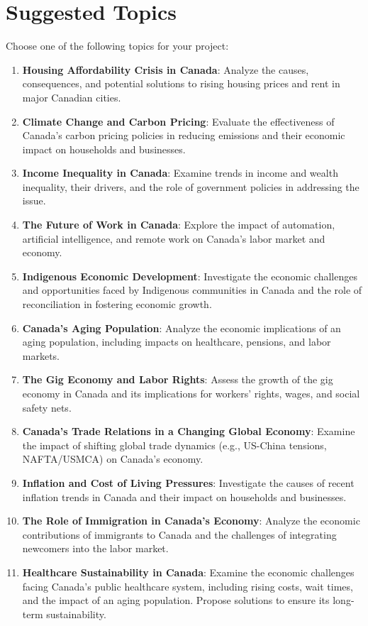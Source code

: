 \documentclass[12pt]{article}
\begin{document}
\section*{Suggested Topics}
Choose one of the following topics for your project:
\begin{enumerate}[label=\arabic*.]
    \item \textbf{Housing Affordability Crisis in Canada}: Analyze the causes, consequences, and potential solutions to rising housing prices and rent in major Canadian cities.
    \item \textbf{Climate Change and Carbon Pricing}: Evaluate the effectiveness of Canada’s carbon pricing policies in reducing emissions and their economic impact on households and businesses.
    \item \textbf{Income Inequality in Canada}: Examine trends in income and wealth inequality, their drivers, and the role of government policies in addressing the issue.
    \item \textbf{The Future of Work in Canada}: Explore the impact of automation, artificial intelligence, and remote work on Canada’s labor market and economy.
    \item \textbf{Indigenous Economic Development}: Investigate the economic challenges and opportunities faced by Indigenous communities in Canada and the role of reconciliation in fostering economic growth.
    \item \textbf{Canada’s Aging Population}: Analyze the economic implications of an aging population, including impacts on healthcare, pensions, and labor markets.
    \item \textbf{The Gig Economy and Labor Rights}: Assess the growth of the gig economy in Canada and its implications for workers’ rights, wages, and social safety nets.
    \item \textbf{Canada’s Trade Relations in a Changing Global Economy}: Examine the impact of shifting global trade dynamics (e.g., US-China tensions, NAFTA/USMCA) on Canada’s economy.
    \item \textbf{Inflation and Cost of Living Pressures}: Investigate the causes of recent inflation trends in Canada and their impact on households and businesses.
    \item \textbf{The Role of Immigration in Canada’s Economy}: Analyze the economic contributions of immigrants to Canada and the challenges of integrating newcomers into the labor market.
    \item \textbf{Healthcare Sustainability in Canada}: Examine the economic challenges facing Canada’s public healthcare system, including rising costs, wait times, and the impact of an aging population. Propose solutions to ensure its long-term sustainability.
\end{enumerate}
\end{document}
